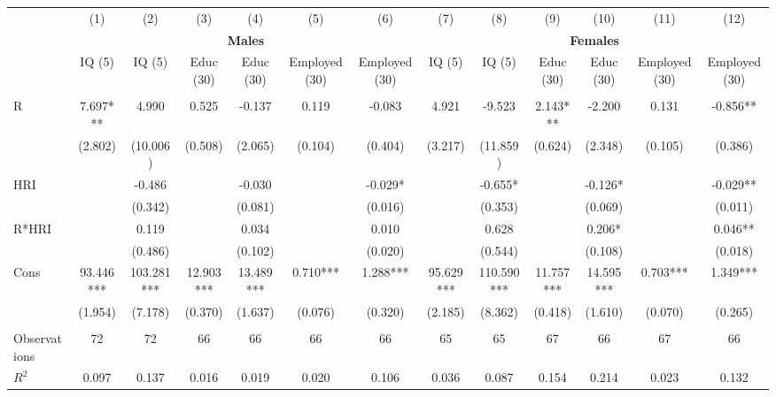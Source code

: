 \begin{tabular}{l|cccccc|cccccc} \toprule
 & (1) & (2) & (3) & (4) & (5) & (6) & (7) & (8) & (9) & (10) & (11) & (12) \\
 & \multicolumn{6}{c}{\textbf{{Males}}} & \multicolumn{6}{c}{\textbf{{Females}}} \\
 & IQ (5) & IQ (5) & Educ (30) & Educ (30) & Employed (30) & Employed (30)  & IQ (5) & IQ (5) & Educ (30) & Educ (30) & Employed (30) & Employed (30) \\ \\ \midrule
R & 7.697*** & 4.990 & 0.525 & -0.137 & 0.119 & -0.083 & 4.921 & -9.523 & 2.143*** & -2.200 & 0.131 & -0.856** \\
 & (2.802) & (10.006) & (0.508) & (2.065) & (0.104) & (0.404) & (3.217) & (11.859) & (0.624) & (2.348) & (0.105) & (0.386) \\
HRI  &  & -0.486 &  & -0.030 &  & -0.029* &  & -0.655* &  & -0.126* &  & -0.029** \\
 &  & (0.342) &  & (0.081) &  & (0.016) &  & (0.353) &  & (0.069) &  & (0.011) \\
R*HRI &  & 0.119 &  & 0.034 &  & 0.010 &  & 0.628 &  & 0.206* &  & 0.046** \\
 &  & (0.486) &  & (0.102) &  & (0.020) &  & (0.544) &  & (0.108) &  & (0.018) \\
Cons & 93.446*** & 103.281*** & 12.903*** & 13.489*** & 0.710*** & 1.288*** & 95.629*** & 110.590*** & 11.757*** & 14.595*** & 0.703*** & 1.349*** \\
 & (1.954) & (7.178) & (0.370) & (1.637) & (0.076) & (0.320) & (2.185) & (8.362) & (0.418) & (1.610) & (0.070) & (0.265) \\ \\ \midrule
Observations & 72 & 72 & 66 & 66 & 66 & 66 & 65 & 65 & 67 & 66 & 67 & 66 \\
$R^2$ & 0.097 & 0.137 & 0.016 & 0.019 & 0.020 & 0.106 & 0.036 & 0.087 & 0.154 & 0.214 & 0.023 & 0.132 \\ \bottomrule
\end{tabular}

